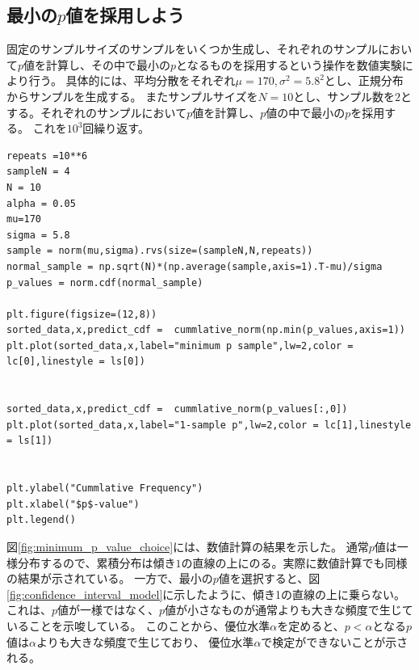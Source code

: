 \subsection{最小の$p$値を採用しよう}
固定のサンプルサイズのサンプルをいくつか生成し、それぞれのサンプルにおいて$p$値を計算し、その中で最小の$p$となるものを採用するという操作を数値実験により行う。
具体的には、平均分散をそれぞれ$\mu=170,\sigma^2=5.8^2$とし、正規分布からサンプルを生成する。
またサンプルサイズを$N=10$とし、サンプル数を$2$とする。それぞれのサンプルにおいて$p$値を計算し、$p$値の中で最小の$p$を採用する。
これを$10^3$回繰り返す。

\begin{lstlisting}
repeats =10**6
sampleN = 4
N = 10
alpha = 0.05
mu=170
sigma = 5.8
sample = norm(mu,sigma).rvs(size=(sampleN,N,repeats)) 
normal_sample = np.sqrt(N)*(np.average(sample,axis=1).T-mu)/sigma
p_values = norm.cdf(normal_sample)

plt.figure(figsize=(12,8))
sorted_data,x,predict_cdf =  cummlative_norm(np.min(p_values,axis=1))
plt.plot(sorted_data,x,label="minimum p sample",lw=2,color = lc[0],linestyle = ls[0])


sorted_data,x,predict_cdf =  cummlative_norm(p_values[:,0])
plt.plot(sorted_data,x,label="1-sample p",lw=2,color = lc[1],linestyle = ls[1])


plt.ylabel("Cummlative Frequency")
plt.xlabel("$p$-value")
plt.legend()  
\end{lstlisting}

図\ref{fig:minimum_p_value_choice}には、数値計算の結果を示した。
通常$p$値は一様分布するので、累積分布は傾き$1$の直線の上にのる。実際に数値計算でも同様の結果が示されている。
一方で、最小の$p$値を選択すると、図\ref{fig:confidence_interval_model}に示したように、傾き1の直線の上に乗らない。
これは、$p$値が一様ではなく、$p$値が小さなものが通常よりも大きな頻度で生じていることを示唆している。
このことから、優位水準$\alpha$を定めると、$p<\alpha$となる$p$値は$\alpha$よりも大きな頻度で生じており、
優位水準$\alpha$で検定ができないことが示される。

